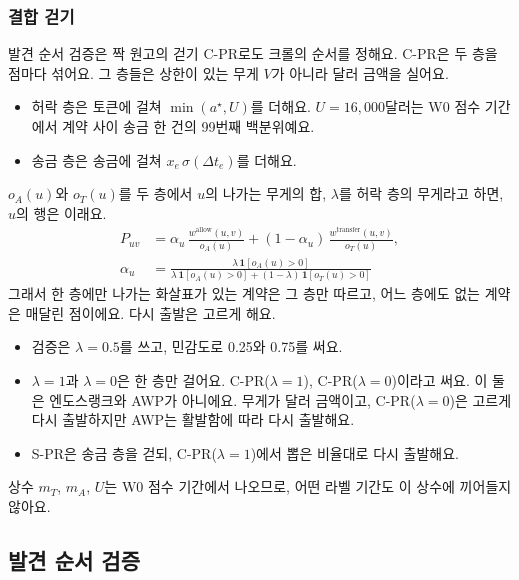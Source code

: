 \subsubsection{결합 걷기}

발견 순서 검증은 짝 원고의 걷기 C-PR로도 크롤의 순서를 정해요. C-PR은 두 층을 점마다 섞어요. 그 층들은 상한이 있는 무게 $V$가 아니라 달러 금액을 실어요.
\begin{itemize}
\item 허락 층은 토큰에 걸쳐 $\min(a^{\star},U)$를 더해요. $U=16{,}000$달러는 W0 점수 기간에서 계약 사이 송금 한 건의 99번째 백분위예요.
\item 송금 층은 송금에 걸쳐 $x_e\,\sigma(\Delta t_e)$를 더해요.
\end{itemize}
$o_A(u)$와 $o_T(u)$를 두 층에서 $u$의 나가는 무게의 합, $\lambda$를 허락 층의 무게라고 하면, $u$의 행은 이래요.
\begin{equation}
\label{eq:cpr}
\begin{aligned}
P_{uv}&=\alpha_u\,\frac{w^{\mathrm{allow}}(u,v)}{o_A(u)}+(1-\alpha_u)\,\frac{w^{\mathrm{transfer}}(u,v)}{o_T(u)},\\[4pt]
\alpha_u&=\frac{\lambda\,\mathbf{1}[o_A(u)>0]}{\lambda\,\mathbf{1}[o_A(u)>0]+(1-\lambda)\,\mathbf{1}[o_T(u)>0]}
\end{aligned}
\end{equation}
그래서 한 층에만 나가는 화살표가 있는 계약은 그 층만 따르고, 어느 층에도 없는 계약은 매달린 점이에요. 다시 출발은 고르게 해요.
\begin{itemize}
\item 검증은 $\lambda=0.5$를 쓰고, 민감도로 0.25와 0.75를 써요.
\item $\lambda=1$과 $\lambda=0$은 한 층만 걸어요. C-PR($\lambda{=}1$), C-PR($\lambda{=}0$)이라고 써요. 이 둘은 엔도스랭크와 AWP가 아니에요. 무게가 달러 금액이고, C-PR($\lambda{=}0$)은 고르게 다시 출발하지만 AWP는 활발함에 따라 다시 출발해요.
\item S-PR은 송금 층을 걷되, C-PR($\lambda{=}1$)에서 뽑은 비율대로 다시 출발해요.
\end{itemize}
상수 $m_T$, $m_A$, $U$는 W0 점수 기간에서 나오므로, 어떤 라벨 기간도 이 상수에 끼어들지 않아요.

\subsection{발견 순서 검증}
\label{sec:test}

